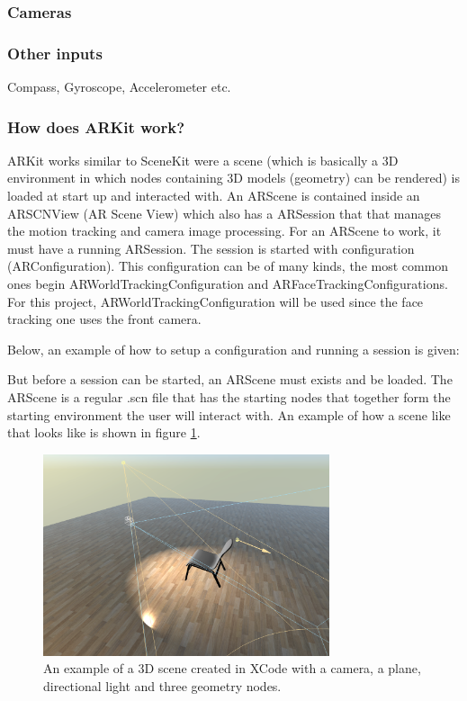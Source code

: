 \subsubsection{Cameras}

\subsubsection{Other inputs}
Compass, Gyroscope, Accelerometer  etc.

\subsubsection{How does ARKit work?}
ARKit works similar to SceneKit were a scene (which is basically a 3D environment in which nodes containing 3D models (geometry) can be rendered) is loaded at start up and interacted with.
An ARScene is contained inside an ARSCNView (AR Scene View) which also has a ARSession
that that manages the motion tracking and camera image processing. For an ARScene to work, it must have a running ARSession.
The session is started with configuration (ARConfiguration). This configuration can be of many kinds, the most common ones begin ARWorldTrackingConfiguration and ARFaceTrackingConfigurations. For this project, ARWorldTrackingConfiguration will be used since the face tracking one uses the front camera.

Below, an example of how to setup a configuration and running a session is given:



But before a session can be started, an ARScene must exists and be loaded. The ARScene is a regular .scn file that has the starting nodes that together form the starting
environment the user will interact with. An example of how a scene like that looks like is shown in figure \ref{fig:3dsceneImage}.

\begin{figure}[hbtp]
\begin{center}
\includegraphics[width = 0.75\textwidth]{./Images/3dscene.jpg} 
\caption{An example of a 3D scene created in XCode with a camera, a plane, directional light and three geometry nodes.}
\label{fig:3dsceneImage}
\end{center}
\end{figure}


